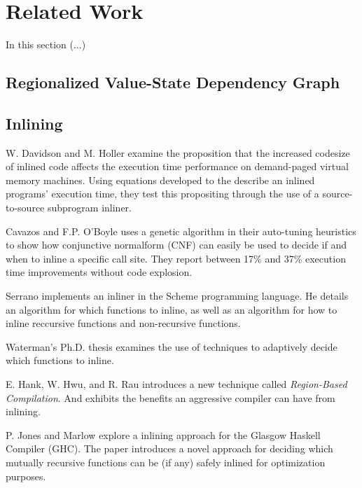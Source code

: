 
\section{Related Work}

In this section (...)

\subsection{Regionalized Value-State Dependency Graph}

\subsection{Inlining}

W. Davidson and M. Holler \cite{SubprogInlining} examine the proposition that
the increased codesize of inlined code affects the execution time performance on
demand-paged virtual memory machines. Using equations developed to the describe
an inlined programs' execution time, they test this propositing through the use
of a source-to-source subprogram inliner.

Cavazos and F.P. O'Boyle \cite{AutoTuningJavaHeuristics} uses a genetic
algorithm in their auto-tuning heuristics to show how conjunctive normalform
(CNF) can easily be used to decide if and when to inline a specific call site.
They report between 17\% and 37\% execution time improvements without code
explosion.

Serrano \cite{InlineWhenHowSerrano} implements an inliner in the Scheme
programming language. He details an algorithm for which functions to inline, as
well as an algorithm for how to inline reccursive functions and non-recursive
functions.

Waterman's Ph.D. thesis \cite{AdaptvCompilAndInlingWaterman} examines the use of
techniques to adaptively decide which functions to inline.

E. Hank, W. Hwu, and R. Rau \cite{RegionBasedCompilationIntroduction} introduces
a new technique called \textit{Region-Based Compilation}. And
exhibits the benefits an aggressive compiler can have from inlining.

P. Jones and Marlow \cite{GHC-paper} explore a inlining approach for the Glasgow
Haskell Compiler (GHC). The paper introduces a novel approach for deciding which
mutually recursive functions can be (if any) safely inlined for optimization
purposes.

